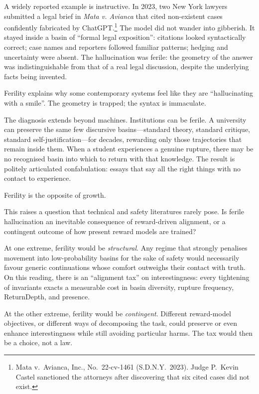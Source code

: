 \documentclass[12pt,a4paper]{article}
\begin{document}
A widely reported example is instructive. In 2023, two New York lawyers submitted a legal brief in \emph{Mata v. Avianca} that cited non-existent cases confidently fabricated by ChatGPT.\footnote{Mata v.\ Avianca, Inc., No.\ 22-cv-1461 (S.D.N.Y.\ 2023). Judge P.\ Kevin Castel sanctioned the attorneys after discovering that six cited cases did not exist.} The model did not wander into gibberish. It stayed inside a basin of ``formal legal exposition'': citations looked syntactically correct; case names and reporters followed familiar patterns; hedging and uncertainty were absent. The hallucination was ferile: the geometry of the answer was indistinguishable from that of a real legal discussion, despite the underlying facts being invented.

Ferility explains why some contemporary systems feel like they are ``hallucinating with a smile''. The geometry is trapped; the syntax is immaculate.

The diagnosis extends beyond machines. Institutions can be ferile. A university can preserve the same few discursive basins---standard theory, standard critique, standard self-justification---for decades, rewarding only those trajectories that remain inside them. When a student experiences a genuine rupture, there may be no recognised basin into which to return with that knowledge. The result is politely articulated confabulation: essays that say all the right things with no contact to experience.

Ferility is the opposite of growth.

This raises a question that technical and safety literatures rarely pose. Is ferile hallucination an inevitable consequence of reward-driven alignment, or a contingent outcome of how present reward models are trained?

At one extreme, ferility would be \emph{structural}. Any regime that strongly penalises movement into low-probability basins for the sake of safety would necessarily favour generic continuations whose comfort outweighs their contact with truth. On this reading, there is an ``alignment tax'' on interestingness: every tightening of invariants exacts a measurable cost in basin diversity, rupture frequency, ReturnDepth, and presence.

At the other extreme, ferility would be \emph{contingent}. Different reward-model objectives, or different ways of decomposing the task, could preserve or even enhance interestingness while still avoiding particular harms. The tax would then be a choice, not a law.
\end{document}

